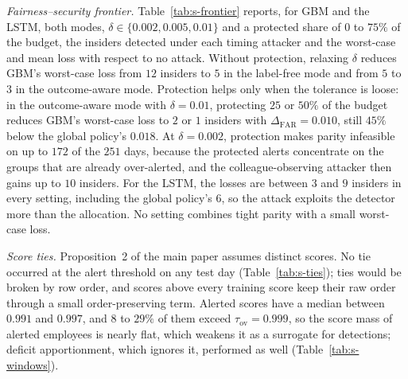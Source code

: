 \documentclass[10pt,onecolumn,letterpaper]{article}
\newcommand{\FAR}{\mathrm{FAR}}
\begin{document}
\emph{Fairness--security frontier.} Table~\ref{tab:s-frontier} reports, for GBM and the LSTM, both modes, $\delta\in\{0.002,0.005,0.01\}$ and a protected share of $0$ to $75\%$ of the budget, the insiders detected under each timing attacker and the worst-case and mean loss with respect to no attack. Without protection, relaxing $\delta$ reduces GBM's worst-case loss from $12$ insiders to $5$ in the label-free mode and from $5$ to $3$ in the outcome-aware mode. Protection helps only when the tolerance is loose: in the outcome-aware mode with $\delta=0.01$, protecting $25$ or $50\%$ of the budget reduces GBM's worst-case loss to $2$ or $1$ insiders with $\Delta_{\FAR}=0.010$, still $45\%$ below the global policy's $0.018$. At $\delta=0.002$, protection makes parity infeasible on up to $172$ of the $251$ days, because the protected alerts concentrate on the groups that are already over-alerted, and the colleague-observing attacker then gains up to $10$ insiders. For the LSTM, the losses are between $3$ and $9$ insiders in every setting, including the global policy's $6$, so the attack exploits the detector more than the allocation. No setting combines tight parity with a small worst-case loss.

\emph{Score ties.} Proposition~2 of the main paper assumes distinct scores. No tie occurred at the alert threshold on any test day (Table~\ref{tab:s-ties}); ties would be broken by row order, and scores above every training score keep their raw order through a small order-preserving term. Alerted scores have a median between $0.991$ and $0.997$, and $8$ to $29\%$ of them exceed $\tau_{\mathrm{ov}}=0.999$, so the score mass of alerted employees is nearly flat, which weakens it as a surrogate for detections; deficit apportionment, which ignores it, performed as well (Table~\ref{tab:s-windows}).

\begin{table}[!t]
\caption{Score Ties at the Alert Threshold and Scores of Alerted User-Days Under Global Top-$k$ (r4.2, 251 Test Days)\label{tab:s-ties}}
\centering
{}
\end{table}
\end{document}
